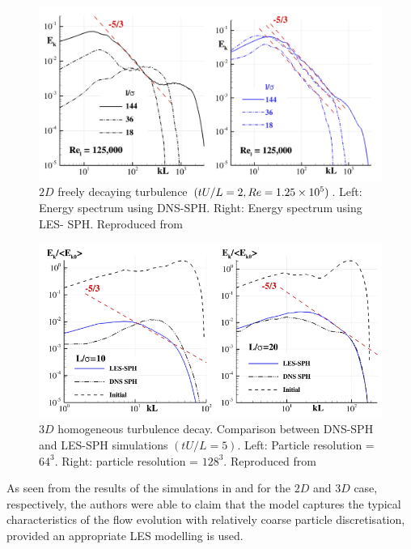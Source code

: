 \begin{figure}[htbp!]
    \centering
    \includegraphics[scale=0.5]{Figures/research_papers/DiMascio2017-fig-4.png}
    \caption{$2D$ freely decaying turbulence $(tU/L = 2, Re = 1.25 \times {10}^{5})$. Left: Energy spectrum using DNS-SPH. Right: Energy spectrum using LES- SPH. Reproduced from \cite{DiMascio2017}}
    \label{fig:DiMascio2017-fig-4}
\end{figure}
\begin{figure}[htbp!]
    \centering
    \includegraphics[scale=0.75]{Figures/research_papers/DiMascio2017-fig-9.png}
    \caption{$3D$ homogeneous turbulence decay. Comparison between DNS-SPH and LES-SPH simulations $(tU/L = 5)$. Left: Particle resolution = $64^3$. Right: particle resolution = $128^3$. Reproduced from \cite{DiMascio2017}}
    \label{fig:DiMascio2017-fig-9}
\end{figure}

 As seen from the results of the simulations in  and  for the $2D$ and $3D$ case, respectively, the authors were able to claim that the model captures the typical characteristics of the flow evolution with relatively coarse particle discretisation, provided an appropriate LES modelling is used.


